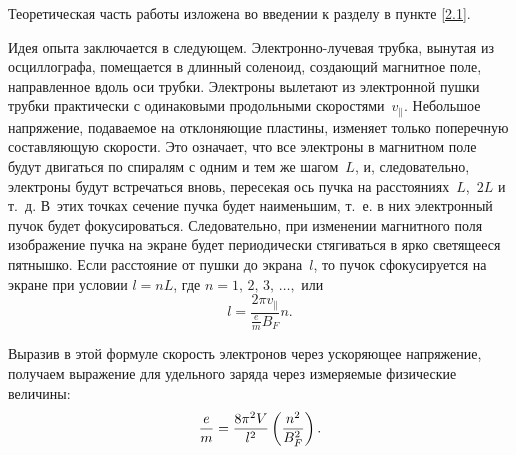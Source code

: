 



Теоретическая часть работы изложена во введении к разделу в пункте \ref{2.1}.

Идея опыта заключается в следующем. Электронно-лучевая трубка, вынутая из
осциллографа, помещается в длинный соленоид, создающий магнитное поле,
направленное вдоль оси трубки. Электроны вылетают из электронной пушки трубки
практически с одинаковыми продольными скоростями~$v_{\parallel}$. Небольшое
напряжение, подаваемое на отклоняющие пластины, изменяет только поперечную
составляющую скорости. Это означает, что все электроны в магнитном поле будут
двигаться по спиралям с одним и тем же шагом~$L$, и, следовательно, электроны
будут встречаться вновь, пересекая ось пучка на расстояниях~$L$,~$2L$ и т.~д.
В~этих точках сечение пучка будет наименьшим, т.~е. в них электронный пучок будет
фокусироваться. Следовательно, при изменении магнитного поля изображение пучка
на экране будет периодически стягиваться в ярко светящееся пятнышко. Если
расстояние от пушки до экрана~$l$, то пучок сфокусируется на экране при условии
$l=nL$, где $n=1,\, 2,\, 3,\, \ldots,$ или
\begin{equation*}
	l=\frac{2\pi v_{\parallel}}{\frac{e}{m} B_F}n.
\end{equation*}

Выразив в этой формуле скорость электронов через ускоряющее напряжение, получаем
выражение для удельного заряда через измеряемые физические величины:
\begin{equation}
	\frac{e}{m}=\frac{8\pi^2V}{l^2}\left(\frac{n^2}{B_F^2}\right).
	\eqmark{3.1.1}
\end{equation}

